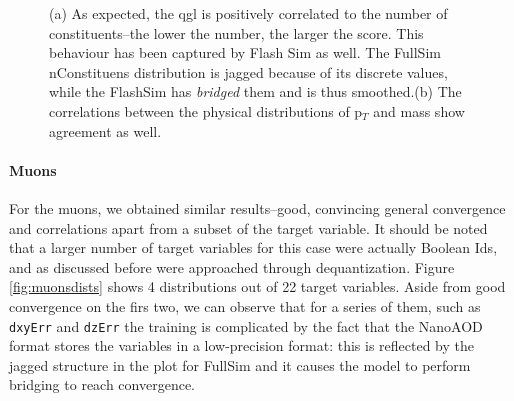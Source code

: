 \begin{figure}
    \myfloatalign
    \caption[qgl and p$_T$ correlations]{ (a) As expected, the qgl is positively correlated to the number of constituents--the lower the number, the larger the score. This behaviour has been captured by Flash Sim as well. The FullSim nConstituens distribution is jagged because of its discrete values, while the FlashSim has \emph{bridged} them and is thus smoothed.(b) The correlations between the physical distributions of p$_T$ and mass show agreement as well.}\label{fig:corrjet2+3}
    
\end{figure}

\paragraph{Muons}

For the muons, we obtained similar results--good, convincing general convergence and correlations apart from a subset of the target variable. It should be noted that a larger number of target variables for this case were actually Boolean Ids, and as discussed before were approached through dequantization. Figure \ref{fig:muonsdists} shows 4 distributions out of 22 target variables. Aside from good convergence on the firs two, we can observe that for a series of them, such as \texttt{dxyErr} and \texttt{dzErr} the training is complicated by the fact that the NanoAOD format stores the variables in a low-precision format: this is reflected by the jagged structure in the plot for FullSim and it causes the model to perform bridging to reach convergence.

